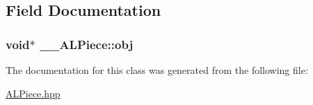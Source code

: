 \subsection{\-Field \-Documentation}
\hypertarget{class____ALPiece_a36db65740f7c33d3ea839b87f3b92d3a}{
\subsubsection[{obj}]{\setlength{\rightskip}{0pt plus 5cm}void$\ast$ {\bf \-\_\-\-\_\-\-A\-L\-Piece\-::obj}}}\label{class____ALPiece_a36db65740f7c33d3ea839b87f3b92d3a}


\-The documentation for this class was generated from the following file\-:\begin{DoxyCompactItemize}
\item 
\hyperlink{ALPiece_8hpp}{\-A\-L\-Piece.\-hpp}\end{DoxyCompactItemize}
